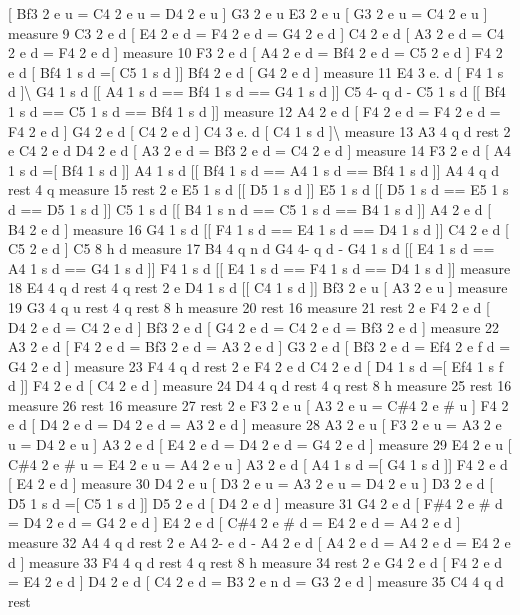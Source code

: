 \mbox{[} Bf3 2 e u = C4 2 e u = D4 2 e u \mbox{]} G3 2 e u E3 2 e u \mbox{[} G3 2 e u = C4 2 e u \mbox{]} measure 9 C3 2 e d \mbox{[} E4 2 e d = F4 2 e d = G4 2 e d \mbox{]} C4 2 e d \mbox{[} A3 2 e d = C4 2 e d = F4 2 e d \mbox{]} measure 10 F3 2 e d \mbox{[} A4 2 e d = Bf4 2 e d = C5 2 e d \mbox{]} F4 2 e d \mbox{[} Bf4 1 s d =\mbox{[} C5 1 s d \mbox{]}\mbox{]} Bf4 2 e d \mbox{[} G4 2 e d \mbox{]} measure 11 E4 3 e. d \mbox{[} F4 1 s d \mbox{]}\textbackslash{} G4 1 s d \mbox{[}\mbox{[} A4 1 s d == Bf4 1 s d == G4 1 s d \mbox{]}\mbox{]} C5 4-\/ q d -\/ C5 1 s d \mbox{[}\mbox{[} Bf4 1 s d == C5 1 s d == Bf4 1 s d \mbox{]}\mbox{]} measure 12 A4 2 e d \mbox{[} F4 2 e d = F4 2 e d = F4 2 e d \mbox{]} G4 2 e d \mbox{[} C4 2 e d \mbox{]} C4 3 e. d \mbox{[} C4 1 s d \mbox{]}\textbackslash{} measure 13 A3 4 q d rest 2 e C4 2 e d D4 2 e d \mbox{[} A3 2 e d = Bf3 2 e d = C4 2 e d \mbox{]} measure 14 F3 2 e d \mbox{[} A4 1 s d =\mbox{[} Bf4 1 s d \mbox{]}\mbox{]} A4 1 s d \mbox{[}\mbox{[} Bf4 1 s d == A4 1 s d == Bf4 1 s d \mbox{]}\mbox{]} A4 4 q d rest 4 q measure 15 rest 2 e E5 1 s d \mbox{[}\mbox{[} D5 1 s d \mbox{]}\mbox{]} E5 1 s d \mbox{[}\mbox{[} D5 1 s d == E5 1 s d == D5 1 s d \mbox{]}\mbox{]} C5 1 s d \mbox{[}\mbox{[} B4 1 s n d == C5 1 s d == B4 1 s d \mbox{]}\mbox{]} A4 2 e d \mbox{[} B4 2 e d \mbox{]} measure 16 G4 1 s d \mbox{[}\mbox{[} F4 1 s d == E4 1 s d == D4 1 s d \mbox{]}\mbox{]} C4 2 e d \mbox{[} C5 2 e d \mbox{]} C5 8 h d measure 17 B4 4 q n d G4 4-\/ q d -\/ G4 1 s d \mbox{[}\mbox{[} E4 1 s d == A4 1 s d == G4 1 s d \mbox{]}\mbox{]} F4 1 s d \mbox{[}\mbox{[} E4 1 s d == F4 1 s d == D4 1 s d \mbox{]}\mbox{]} measure 18 E4 4 q d rest 4 q rest 2 e D4 1 s d \mbox{[}\mbox{[} C4 1 s d \mbox{]}\mbox{]} Bf3 2 e u \mbox{[} A3 2 e u \mbox{]} measure 19 G3 4 q u rest 4 q rest 8 h measure 20 rest 16 measure 21 rest 2 e F4 2 e d \mbox{[} D4 2 e d = C4 2 e d \mbox{]} Bf3 2 e d \mbox{[} G4 2 e d = C4 2 e d = Bf3 2 e d \mbox{]} measure 22 A3 2 e d \mbox{[} F4 2 e d = Bf3 2 e d = A3 2 e d \mbox{]} G3 2 e d \mbox{[} Bf3 2 e d = Ef4 2 e f d = G4 2 e d \mbox{]} measure 23 F4 4 q d rest 2 e F4 2 e d C4 2 e d \mbox{[} D4 1 s d =\mbox{[} Ef4 1 s f d \mbox{]}\mbox{]} F4 2 e d \mbox{[} C4 2 e d \mbox{]} measure 24 D4 4 q d rest 4 q rest 8 h measure 25 rest 16 measure 26 rest 16 measure 27 rest 2 e F3 2 e u \mbox{[} A3 2 e u = C\#4 2 e \# u \mbox{]} F4 2 e d \mbox{[} D4 2 e d = D4 2 e d = A3 2 e d \mbox{]} measure 28 A3 2 e u \mbox{[} F3 2 e u = A3 2 e u = D4 2 e u \mbox{]} A3 2 e d \mbox{[} E4 2 e d = D4 2 e d = G4 2 e d \mbox{]} measure 29 E4 2 e u \mbox{[} C\#4 2 e \# u = E4 2 e u = A4 2 e u \mbox{]} A3 2 e d \mbox{[} A4 1 s d =\mbox{[} G4 1 s d \mbox{]}\mbox{]} F4 2 e d \mbox{[} E4 2 e d \mbox{]} measure 30 D4 2 e u \mbox{[} D3 2 e u = A3 2 e u = D4 2 e u \mbox{]} D3 2 e d \mbox{[} D5 1 s d =\mbox{[} C5 1 s d \mbox{]}\mbox{]} D5 2 e d \mbox{[} D4 2 e d \mbox{]} measure 31 G4 2 e d \mbox{[} F\#4 2 e \# d = D4 2 e d = G4 2 e d \mbox{]} E4 2 e d \mbox{[} C\#4 2 e \# d = E4 2 e d = A4 2 e d \mbox{]} measure 32 A4 4 q d rest 2 e A4 2-\/ e d -\/ A4 2 e d \mbox{[} A4 2 e d = A4 2 e d = E4 2 e d \mbox{]} measure 33 F4 4 q d rest 4 q rest 8 h measure 34 rest 2 e G4 2 e d \mbox{[} F4 2 e d = E4 2 e d \mbox{]} D4 2 e d \mbox{[} C4 2 e d = B3 2 e n d = G3 2 e d \mbox{]} measure 35 C4 4 q d rest 